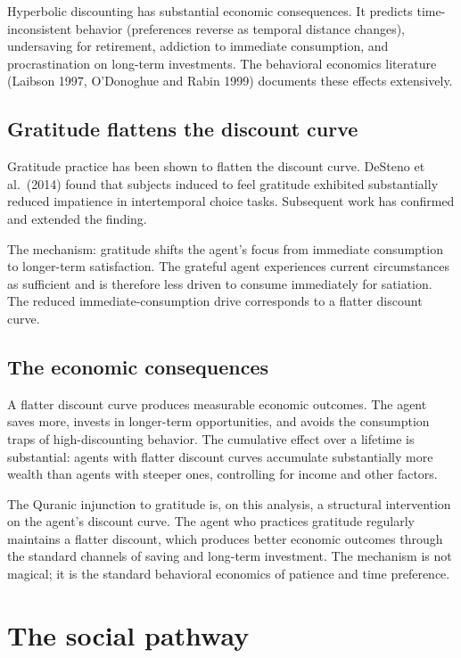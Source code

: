 Hyperbolic discounting has substantial economic consequences. It
predicts time-inconsistent behavior (preferences reverse as
temporal distance changes), undersaving for retirement, addiction
to immediate consumption, and procrastination on long-term
investments. The behavioral economics literature (Laibson 1997,
O'Donoghue and Rabin 1999) documents these effects extensively.

\subsection{Gratitude flattens the discount curve}

Gratitude practice has been shown to flatten the discount curve.
DeSteno et al.\ (2014) found that subjects induced to feel
gratitude exhibited substantially reduced impatience in
intertemporal choice tasks. Subsequent work has confirmed and
extended the finding.

The mechanism: gratitude shifts the agent's focus from immediate
consumption to longer-term satisfaction. The grateful agent
experiences current circumstances as sufficient and is therefore
less driven to consume immediately for satiation. The reduced
immediate-consumption drive corresponds to a flatter discount
curve.

\subsection{The economic consequences}

A flatter discount curve produces measurable economic outcomes.
The agent saves more, invests in longer-term opportunities, and
avoids the consumption traps of high-discounting behavior. The
cumulative effect over a lifetime is substantial: agents with
flatter discount curves accumulate substantially more wealth than
agents with steeper ones, controlling for income and other
factors.

The Quranic injunction to gratitude is, on this analysis, a
structural intervention on the agent's discount curve. The agent
who practices gratitude regularly maintains a flatter discount,
which produces better economic outcomes through the standard
channels of saving and long-term investment. The mechanism is
not magical; it is the standard behavioral economics of patience
and time preference.

\section{The social pathway}
\label{sec:grat-social}

